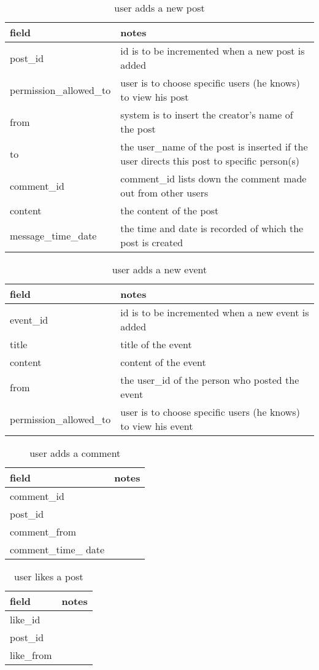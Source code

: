 \begin{table}[h]
    \centering
    \begin{tabular}{ll}
    field                 & notes\\ \hline
    post\_id               & id is to be incremented when a new post is added\\
    permission\_allowed\_to & user is to choose specific users (he knows) to view his post\\
    from                  & system is to insert the creator's name of the post\\
    to                    & the user\_name of the post is inserted if the user directs this post to specific person(s)\\
    comment\_id            & comment\_id lists down the comment made out from other users\\
    content               & the content of the post\\
    message\_time\_date     & the time and date is recorded of which the post is created\\
    \end{tabular}
    \caption{user adds a new post}
\end{table}

\begin{table}[h]
    \centering
    \begin{tabular}{ll}
    field                 & notes\\ \hline
    event\_id              & id is to be incremented when a new event is added\\
    title                 & title of the event\\
    content               & content of the event\\
    from                  & the user\_id of the person who posted the event\\
    permission\_allowed\_to & user is to choose specific users (he knows) to view his event\\
    \end{tabular}
    \caption{user adds a new event}
\end{table}

\begin{table}[h]
    \centering
    \begin{tabular}{ll}
    field              & notes\\ \hline
    comment\_id         & \\
    post\_id            & \\
    comment\_from       & \\
    comment\_time\_ date & \\
    \end{tabular}
    \caption{user adds a comment}
\end{table}

\begin{table}[h]
    \centering
    \begin{tabular}{ll}
    field     & notes\\ \hline
    like\_id   & \\
    post\_id   & \\
    like\_from & \\
    \end{tabular}
    \caption{user likes a post}
\end{table}
